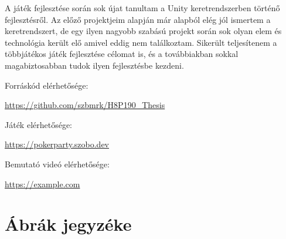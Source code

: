 \documentclass[]{thesis-ekf}
\theoremstyle{definition}
\theoremstyle{remark}
\begin{document}
A játék fejlesztése során sok újat tanultam a Unity keretrendszerben történő fejlesztésről. Az előző projektjeim alapján már alapból elég jól ismertem a keretrendszert, de egy ilyen nagyobb szabású projekt során sok olyan elem és technológia került elő amivel eddig nem találkoztam. Sikerült teljesítenem a többjátékos játék fejlesztése célomat is, és a továbbiakban sokkal magabiztosabban tudok ilyen fejlesztésbe kezdeni.

\begin{center}
	Forráskód elérhetősége:
	
	{\color{teal}\url{https://github.com/szbmrk/H8P190_Thesis}}
	
	Játék elérhetősége:
	
	{\color{teal}\url{https://pokerparty.szobo.dev}}
	
	Bemutató videó elérhetősége:
	
	{\color{teal}\url{https://example.com}}
\end{center}

\chapter*{Ábrák jegyzéke}
\end{document}
